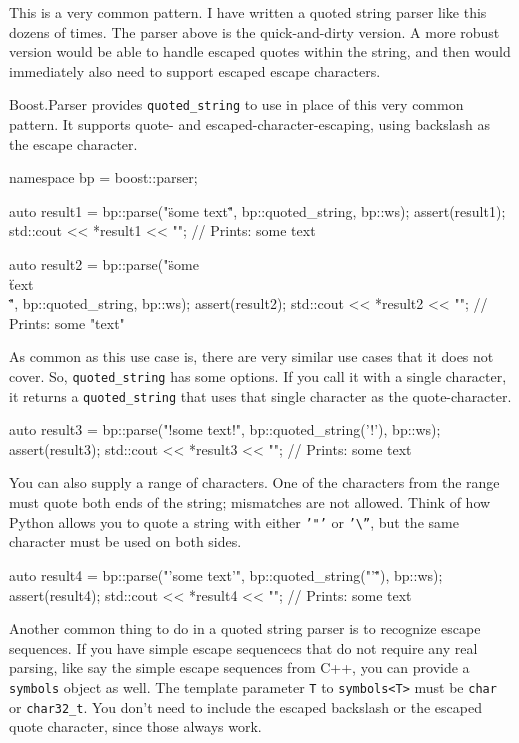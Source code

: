This is a very common pattern. I have written a quoted string parser like this dozens of times. The parser above is the quick-and-dirty version. A more robust version would be able to handle escaped quotes within the string, and then would immediately also need to support escaped escape characters.

Boost.Parser provides \texttt{quoted\_string} to use in place of this very common pattern. It supports quote- and escaped-character-escaping, using backslash as the escape character.

\begin{code}
namespace bp = boost::parser;

auto result1 = bp::parse("\"some text\"", bp::quoted_string, bp::ws);
assert(result1);
std::cout << *result1 << "\n"; // Prints: some text

auto result2 =
    bp::parse("\"some \\\"text\\\"\"", bp::quoted_string, bp::ws);
assert(result2);
std::cout << *result2 << "\n"; // Prints: some "text"
\end{code}

As common as this use case is, there are very similar use cases that it does not cover. So, \texttt{quoted\_string} has some options. If you call it with a single character, it returns a \texttt{quoted\_string} that uses that single character as the quote-character.

\begin{code}
auto result3 = bp::parse("!some text!", bp::quoted_string('!'), bp::ws);
assert(result3);
std::cout << *result3 << "\n"; // Prints: some text
\end{code}

You can also supply a range of characters. One of the characters from the range must quote both ends of the string; mismatches are not allowed. Think of how Python allows you to quote a string with either \texttt{'"'} or \texttt{'\textbackslash{}''}, but the same character must be used on both sides.

\begin{code}
auto result4 = bp::parse("'some text'", bp::quoted_string("'\""), bp::ws);
assert(result4);
std::cout << *result4 << "\n"; // Prints: some text
\end{code}

Another common thing to do in a quoted string parser is to recognize escape sequences. If you have simple escape sequencecs that do not require any real parsing, like say the simple escape sequences from C++, you can provide a \texttt{symbols} object as well. The template parameter \texttt{T} to \texttt{symbols<T>} must be \texttt{char} or \texttt{char32\_t}. You don't need to include the escaped backslash or the escaped quote character, since those always work.

